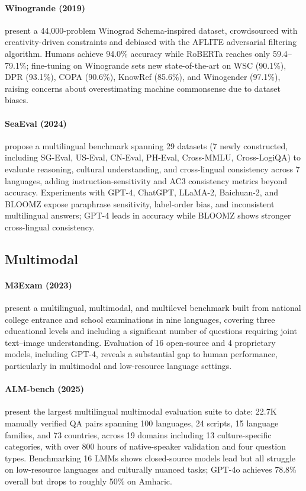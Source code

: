 \documentclass[letterpaper]{article}
\begin{document}
\paragraph{Winogrande (2019)} \citet{sakaguchi2019winograndeadversarialwinogradschema} present a 44,000-problem Winograd Schema-inspired dataset, crowdsourced with creativity-driven constraints and debiased with the AFLITE adversarial filtering algorithm. Humans achieve 94.0\% accuracy while RoBERTa reaches only 59.4--79.1\%; fine-tuning on Winogrande sets new state-of-the-art on WSC (90.1\%), DPR (93.1\%), COPA (90.6\%), KnowRef (85.6\%), and Winogender (97.1\%), raising concerns about overestimating machine commonsense due to dataset biases.

\paragraph{SeaEval (2024)} \citet{wang2024seaevalmultilingualfoundationmodels} propose a multilingual benchmark spanning 29 datasets (7 newly constructed, including SG-Eval, US-Eval, CN-Eval, PH-Eval, Cross-MMLU, Cross-LogiQA) to evaluate reasoning, cultural understanding, and cross-lingual consistency across 7 languages, adding instruction-sensitivity and AC3 consistency metrics beyond accuracy. Experiments with GPT-4, ChatGPT, LLaMA-2, Baichuan-2, and BLOOMZ expose paraphrase sensitivity, label-order bias, and inconsistent multilingual answers; GPT-4 leads in accuracy while BLOOMZ shows stronger cross-lingual consistency.

\subsection{Multimodal}

\paragraph{M3Exam (2023)} \citet{zhang2023m3exam} present a multilingual, multimodal, and multilevel benchmark built from national college entrance and school examinations in nine languages, covering three educational levels and including a significant number of questions requiring joint text--image understanding. Evaluation of 16 open-source and 4 proprietary models, including GPT-4, reveals a substantial gap to human performance, particularly in multimodal and low-resource language settings.

\paragraph{ALM-bench (2025)} \citet{vayani2025languagesmatterevaluatinglmms} present the largest multilingual multimodal evaluation suite to date: 22.7K manually verified QA pairs spanning 100 languages, 24 scripts, 15 language families, and 73 countries, across 19 domains including 13 culture-specific categories, with over 800 hours of native-speaker validation and four question types. Benchmarking 16 LMMs shows closed-source models lead but all struggle on low-resource languages and culturally nuanced tasks; GPT-4o achieves 78.8\% overall but drops to roughly 50\% on Amharic.
\end{document}
